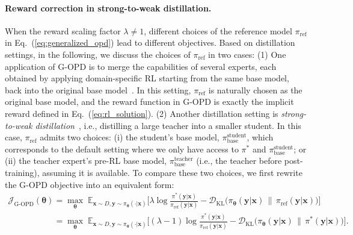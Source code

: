 \documentclass{article} %
\begin{document}
\paragraph{Reward correction in strong-to-weak distillation.} When the reward scaling factor $\lambda \neq 1$, different choices of the reference model $\pi_{\mathrm{ref}}$ in Eq.~(\ref{eq:generalized_opd}) lead to different objectives. Based on distillation settings, in the following, we discuss the choices of $\pi_{\mathrm{ref}}$ in two cases: (1) One application of G-OPD is to merge the capabilities of several experts, each obtained by applying domain-specific RL starting from the same base model, back into the original base model~\citep{mimo}. In this setting, $\pi_{\mathrm{ref}}$ is naturally chosen as the original base model, and the reward function in G-OPD is exactly the implicit reward defined in Eq.~(\ref{eq:rl_solution}). (2) Another distillation setting is \emph{strong-to-weak distillation}~\citep{qwen3}, i.e., distilling a large teacher into a smaller student. In this case, $\pi_{\mathrm{ref}}$ admits two choices: (i) the student’s base model, $\pi_{\mathrm{base}}^{\mathrm{student}}$, which corresponds to the default setting where we only have access to $\pi^{*}$ and $\pi_{\mathrm{base}}^{\mathrm{student}}$; or (ii) the teacher expert’s pre-RL base model, $\pi_{\mathrm{base}}^{\mathrm{teacher}}$ (i.e., the teacher before post-training), assuming it is available. To compare these two choices, we first rewrite the G-OPD objective into an equivalent form:
\begin{equation}
\label{eq:generalized_opd_2}
\begin{aligned}
\mathcal{J}_{\text{G-OPD}}(\boldsymbol{\theta}) & =
\max_{\boldsymbol{\theta}}\;
\mathbb{E}_{\boldsymbol{x} \sim D, \boldsymbol{y} \sim \pi_{\boldsymbol{\theta}} (\cdot | \boldsymbol{x}) }\Big[ \lambda
\log  \frac{\pi^{*}(\boldsymbol{y}| \boldsymbol{x} )}{\pi_{\mathrm{ref}} (\boldsymbol{y}| \boldsymbol{x} )}  - \mathcal{D}_{\mathrm{KL}} \!\big(
\pi_{\boldsymbol{\theta}}(\boldsymbol{y} | \boldsymbol{x})
\,\big\|\,
\pi_{\mathrm{ref}}( \boldsymbol{y} | \boldsymbol{x})
\big)
\Big] \\ & = 
\max_{\boldsymbol{\theta}}\;
\mathbb{E}_{\boldsymbol{x} \sim D, \boldsymbol{y} \sim \pi_{\boldsymbol{\theta}} (\cdot | \boldsymbol{x}) }\Big[ (\lambda - 1)
\log  \frac{\pi^{*}(\boldsymbol{y}| \boldsymbol{x} )}{\pi_{\mathrm{ref}} (\boldsymbol{y}| \boldsymbol{x} )}  - \mathcal{D}_{\mathrm{KL}} \!\big(
\pi_{\boldsymbol{\theta}}(\boldsymbol{y} | \boldsymbol{x})
\,\big\|\,
\pi^{*}( \boldsymbol{y} | \boldsymbol{x})
\big)
\Big].
\end{aligned}
\end{equation}
\end{document}
